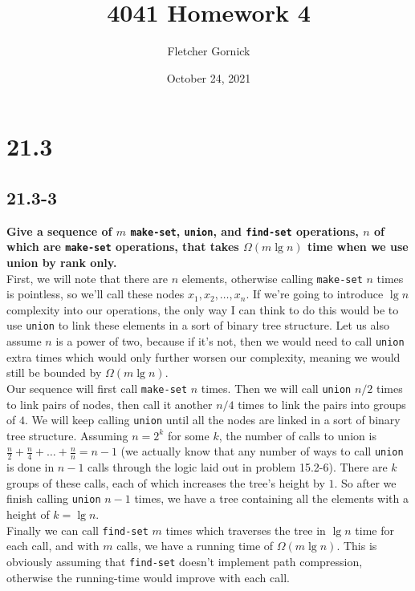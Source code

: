 \documentclass[11pt]{article}
\title{4041 Homework 4}
\author{Fletcher Gornick}
\date{October 24, 2021}
\begin{document}
 \maketitle 
 \section*{21.3}
 \subsection*{21.3-3}
 \textbf{Give a sequence of $m$ \texttt{make-set}, \texttt{union}, and \texttt{find-set} 
 operations, $n$ of which are \texttt{make-set} operations, that takes $\Omega(m\lg n)$ time 
 when we use union by rank only.} \\ 

 First, we will note that there are $n$ elements, otherwise calling \texttt{make-set} $n$ times 
 is pointless, so we'll call these nodes $x_1, x_2, \dots , x_n$.  If we're going to introduce 
 $\lg n$ complexity into our operations, the only way I can think to do this would be to use 
 \texttt{union} to link these elements in a sort of binary tree structure.  Let us also assume 
 $n$ is a power of two, because if it's not, then we would need to call \texttt{union} extra 
 times which would only further worsen our complexity, meaning we would still be bounded by 
 $\Omega (m \lg n)$. \\

 Our sequence will first call \texttt{make-set} $n$ times.  Then we will call \texttt{union} 
 $n/2$ times to link pairs of nodes, then call it another $n/4$ times to link the pairs into 
 groups of $4$.  We will keep calling \texttt{union} until all the nodes are linked in a sort 
 of binary tree structure.  Assuming $n = 2^k$ for some $k$, the number of calls to union is 
 $\frac{n}{2} + \frac{n}{4} + \dots + \frac{n}{n} = n-1$ (we actually know that any number of 
 ways to call \texttt{union} is done in $n-1$ calls through the logic laid out in problem 
 15.2-6).  There are $k$ groups of these calls, each of which increases the tree's height by 
 $1$.  So after we finish calling \texttt{union} $n-1$ times, we have a tree containing all 
 the elements with a height of $k = \lg n$. \\

 Finally we can call \texttt{find-set} $m$ times which traverses the tree in $\lg n$ time for 
 each call, and with $m$ calls, we have a running time of $\Omega (m \lg n)$.  This is obviously 
 assuming that \texttt{find-set} doesn't implement path compression, otherwise the running-time 
 would improve with each call.  
\end{document}
